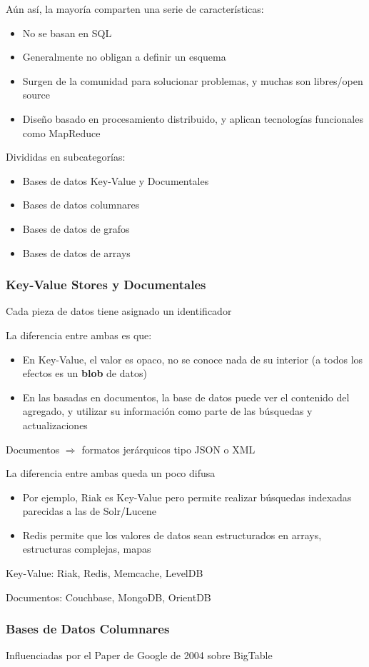 Aún así, la mayoría comparten una serie de características:
\begin{itemize}
\item No se basan en SQL
\item Generalmente no obligan a definir un esquema
\item Surgen de la comunidad para solucionar problemas, y muchas son libres/open source
\item Diseño basado en procesamiento distribuido, y aplican tecnologías funcionales como MapReduce
\end{itemize}
Divididas en subcategorías:
\begin{itemize}
\item Bases de datos Key-Value y Documentales
\item Bases de datos columnares
\item Bases de datos de grafos
\item Bases de datos de arrays
\end{itemize}
\subsubsection{Key-Value Stores y Documentales}
Cada pieza de datos tiene asignado un identificador

La diferencia entre ambas es que:
\begin{itemize}
\item En Key-Value, el valor es opaco, no se conoce nada de su interior (a todos los efectos es un \textbf{blob} de datos)
\item En las basadas en documentos, la base de datos puede ver el contenido del agregado, y utilizar su información como parte de las búsquedas y actualizaciones
\end{itemize}
Documentos $\Rightarrow$ formatos jerárquicos tipo JSON o XML

La diferencia entre ambas queda un poco difusa
\begin{itemize}
\item Por ejemplo, Riak es Key-Value pero permite realizar búsquedas indexadas parecidas a las de Solr/Lucene
\item Redis permite que los valores de datos sean estructurados en arrays, estructuras complejas, mapas
\end{itemize}
Key-Value: Riak, Redis, Memcache, LevelDB

Documentos: Couchbase, MongoDB, OrientDB
\subsubsection{Bases de Datos Columnares}
Influenciadas por el Paper de Google de 2004 sobre BigTable

